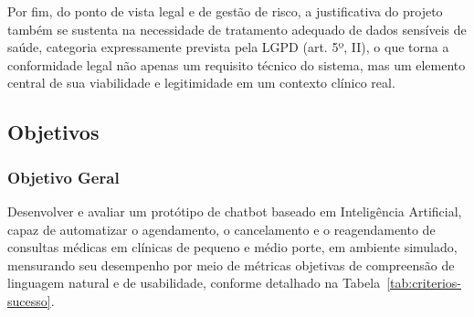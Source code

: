 \documentclass[12pt,a4paper]{extarticle}
\begin{document}
Por fim, do ponto de vista legal e de gestão de risco, a justificativa do projeto também se sustenta na necessidade de tratamento adequado de dados sensíveis de saúde, categoria expressamente prevista pela LGPD (art. 5º, II), o que torna a conformidade legal não apenas um requisito técnico do sistema, mas um elemento central de sua viabilidade e legitimidade em um contexto clínico real.

\subsection{Objetivos}

\subsubsection{Objetivo Geral}


Desenvolver e avaliar um protótipo de chatbot baseado em Inteligência Artificial, capaz de automatizar o agendamento, o cancelamento e o reagendamento de consultas médicas em clínicas de pequeno e médio porte, em ambiente simulado, mensurando seu desempenho por meio de métricas objetivas de compreensão de linguagem natural e de usabilidade, conforme detalhado na Tabela~\ref{tab:criterios-sucesso}.
\end{document}
